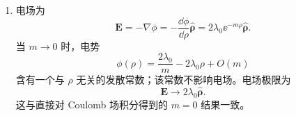 \begin{question}[Proca 场]
\begin{solution}
\begin{enumerate}
  \item 电场为
  \[
    \mathbf E=-\nabla\phi=-\frac{\dd{\phi}}{\dd{\rho}}\hat{\boldsymbol\rho}
    =\boxed{2\lambda_0\ee^{-m\rho}\hat{\boldsymbol\rho}} .
  \]
  当 $m\to0$ 时，电势
  \[
    \phi(\rho)=\frac{2\lambda_0}{m}-2\lambda_0\rho+O(m)
  \]
  含有一个与 $\rho$ 无关的发散常数；该常数不影响电场。电场极限为
  \[
    \mathbf E\to2\lambda_0\hat{\boldsymbol\rho} .
  \]
  这与直接对 Coulomb 场积分得到的 $m=0$ 结果一致。
\end{enumerate}
\end{solution}
\end{question}
